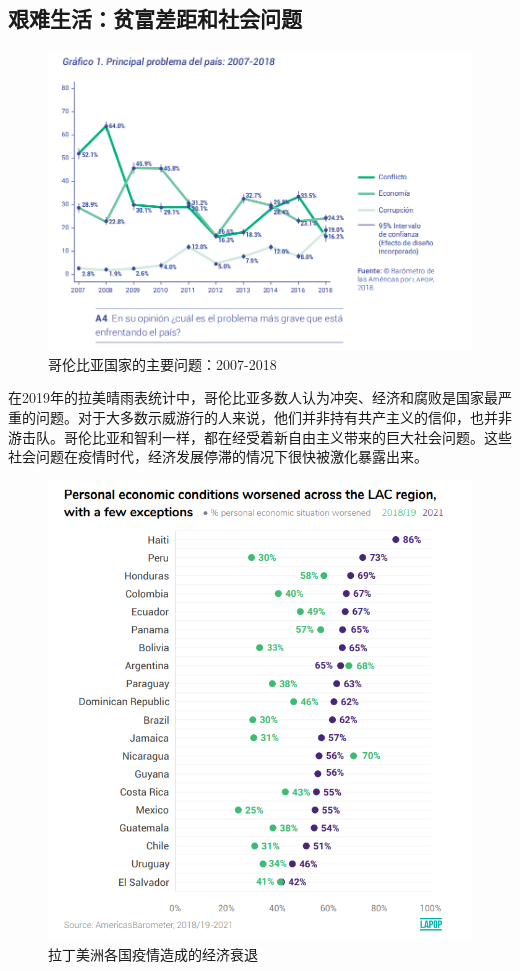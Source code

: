 \documentclass{phyasgn}\usepackage{nag}
\begin{document}
\subsection{艰难生活：贫富差距和社会问题}
	\begin{figure}[!h]
	\centering
	\includegraphics[width=.9\linewidth]{pic/1.png}
	\caption{哥伦比亚国家的主要问题：2007-2018\protect\footnotemark[4]}
	\label{fig:1}
	\end{figure}
    \par 在2019年的拉美晴雨表统计中，哥伦比亚多数人认为冲突、经济和腐败是国家最严重的问题。对于大多数示威游行的人来说，他们并非持有共产主义的信仰，也并非游击队。哥伦比亚和智利一样，都在经受着新自由主义带来的巨大社会问题。这些社会问题在疫情时代，经济发展停滞的情况下很快被激化暴露出来。
    \begin{figure}[!h]
    	\centering
    	\includegraphics[width=.9\linewidth]{pic/2.png}
    	\caption{拉丁美洲各国疫情造成的经济衰退}
    	\label{fig:2}
    	\end{figure}
\end{document}
